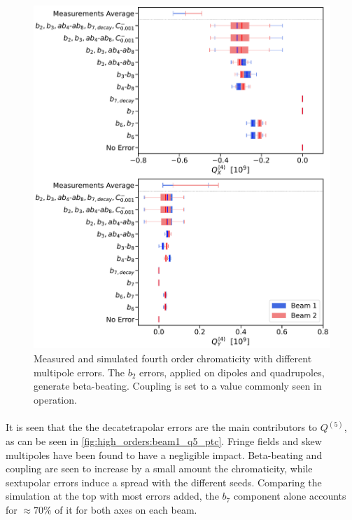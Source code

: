 \begin{figure}[!htb]
    \centering
    \includegraphics[width=0.9\columnwidth]{images/q4_ptc.pdf}
    \caption{Measured and simulated fourth order chromaticity with different multipole errors. The
    $b_2$ errors, applied on dipoles and quadrupoles, generate beta-beating. Coupling is set to a
    value commonly seen in operation.}
    \label{fig:high_orders:beam1_q4_ptc}
\end{figure}



\paragraph{}

It is seen that the the decatetrapolar errors are the main contributors to $Q^{(5)}$, as can be seen
in \cref{fig:high_orders:beam1_q5_ptc}. Fringe fields and skew multipoles have been found to have a
negligible impact. 
Beta-beating and coupling are seen to increase by a small amount the chromaticity, while sextupolar
errors induce a spread with the different seeds. 
Comparing the simulation at the top with most errors added, the $b_7$ component alone accounts for
$\approx 70\%$ of it for both axes on each beam.

